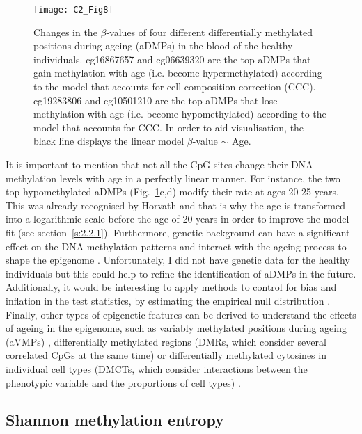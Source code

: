 \begin{figure}[htbp!] 
	\centering    
	\texttt{[image: C2\_Fig8]}
	\caption[Changes in the $\beta$-values of four different aDMPs]{Changes in the $\beta$-values of four different differentially methylated positions during ageing (aDMPs) in the blood of the healthy individuals. cg16867657 and cg06639320 are the top aDMPs that gain methylation with age (i.e. become hypermethylated) according to the model that accounts for cell composition correction (CCC). cg19283806 and cg10501210 are the top aDMPs that lose methylation with age (i.e. become hypomethylated) according to the model that accounts for CCC. In order to aid visualisation, the black line displays the linear model $\beta$-value $\sim$ Age.}
	\label{fig:c2_fig8}
\end{figure}

\bigskip

It is important to mention that not all the CpG sites change their DNA methylation levels with age in a perfectly linear manner. For instance, the two top hypomethylated aDMPs (Fig.~\ref{fig:c2_fig8}c,d) modify their rate at ages 20-25 years. This was already recognised by Horvath \cite{Horvath2013} and that is why the age is transformed into a logarithmic scale before the age of 20 years in order to improve the model fit (see section~\ref{s:2.2.1}). Furthermore, genetic background can have a significant effect on the DNA methylation patterns and interact with the ageing process to shape the epigenome \cite{VanDongen2016,Hannum2013}. Unfortunately, I did not have genetic data for the healthy individuals but this could help to refine the identification of aDMPs in the future. Additionally, it would be interesting to apply methods to control for bias and inflation in the test statistics, by estimating the empirical null distribution \cite{VanIterson2017}. Finally, other types of epigenetic features can be derived to understand the effects of ageing in the epigenome, such as variably methylated positions during ageing (\acrshort{aVMPs}) \cite{Slieker2016}, differentially methylated regions (\acrshort{DMRs}, which consider several correlated CpGs at the same time) \cite{Teschendorff2018} or differentially methylated cytosines in individual cell types (\acrshort{DMCTs}, which consider interactions between the phenotypic variable and the proportions of cell types) \cite{Zheng2018}.


\smallskip

\subsection{Shannon methylation entropy} \label{s:2.1.5}

